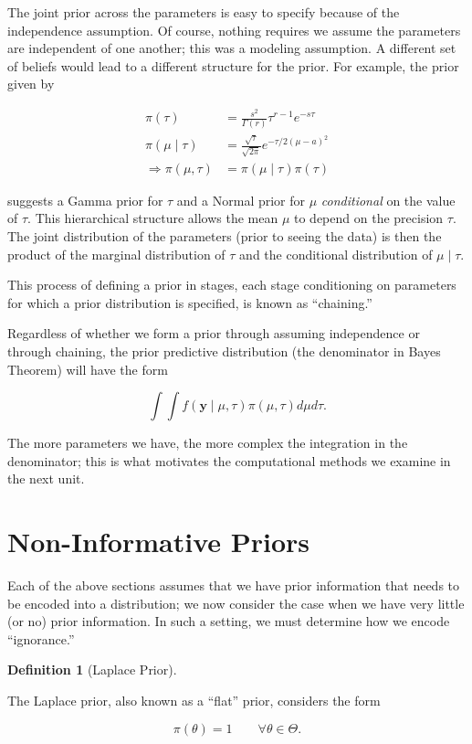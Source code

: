 \documentclass[
  letterpaper,
  DIV=11,
  numbers=noendperiod]{scrreprt}
\theoremstyle{definition}
\theoremstyle{definition}
\newtheorem{definition}{Definition}[chapter]
\theoremstyle{plain}
\theoremstyle{remark}
\begin{document}
The joint prior across the parameters is easy to specify because of the
independence assumption. Of course, nothing requires we assume the
parameters are independent of one another; this was a modeling
assumption. A different set of beliefs would lead to a different
structure for the prior. For example, the prior given by

\[
\begin{aligned}
  \pi(\tau) &= \frac{s^2}{\Gamma(r)} \tau^{r - 1} e^{-s\tau} \\
  \pi(\mu \mid \tau) &= \frac{\sqrt{\tau}}{\sqrt{2\pi}} e^{-\tau/2 (\mu - a)^2} \\
  \Rightarrow \pi(\mu, \tau) &= \pi(\mu \mid \tau) \pi(\tau)
\end{aligned}
\]

suggests a Gamma prior for \(\tau\) and a Normal prior for \(\mu\)
\emph{conditional} on the value of \(\tau\). This hierarchical structure
allows the mean \(\mu\) to depend on the precision \(\tau\). The joint
distribution of the parameters (prior to seeing the data) is then the
product of the marginal distribution of \(\tau\) and the conditional
distribution of \(\mu \mid \tau\).

This process of defining a prior in stages, each stage conditioning on
parameters for which a prior distribution is specified, is known as
``chaining.''

Regardless of whether we form a prior through assuming independence or
through chaining, the prior predictive distribution (the denominator in
Bayes Theorem) will have the form

\[\int \int f(\mathbf{y} \mid \mu, \tau) \pi(\mu, \tau) d\mu d\tau.\]

The more parameters we have, the more complex the integration in the
denominator; this is what motivates the computational methods we examine
in the next unit.

\hypertarget{non-informative-priors}{%
\section{Non-Informative Priors}\label{non-informative-priors}}

Each of the above sections assumes that we have prior information that
needs to be encoded into a distribution; we now consider the case when
we have very little (or no) prior information. In such a setting, we
must determine how we encode ``ignorance.''

\begin{definition}[Laplace
Prior]\protect\hypertarget{def-laplace-prior}{}\label{def-laplace-prior}

The Laplace prior, also known as a ``flat'' prior, considers the form

\[\pi(\theta) = 1 \qquad \forall \theta \in \Theta.\]

\end{definition}
\end{document}
